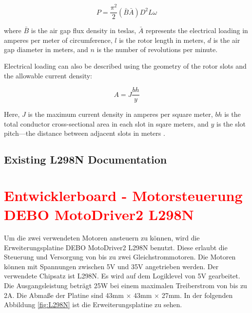 \begin{equation}
	P = \frac{\pi^2}{2}(\bar{B}\bar{A})D^2L\omega
	\label{eq:velTorqRelation}
\end{equation}

where $\bar{B}$ is the air gap flux density in teslas, $\bar{A}$ represents the electrical loading in amperes per meter of circumference, $l$ is the rotor length in meters, $d$ is the air gap diameter in meters, and $n$ is the number of revolutions per minute.

Electrical loading can also be described using the geometry of the rotor slots and the allowable current density:

\begin{equation}
	A = J \frac{bh}{y}
	\label{eq:elLoading}
\end{equation}

Here, $J$ is the maximum current density in amperes per square meter, $bh$ is the total conductor cross-sectional area in each slot in sqare meters, and $y$ is the slot pitch—the distance between adjacent slots in meters \cite[see][26]{Toliyat:2004}.


\section{Existing L298N Documentation}
\chapter{\textcolor{red}{{Entwicklerboard - Motorsteuerung DEBO MotoDriver2 L298N}}}





Um die zwei verwendeten Motoren ansteuern zu können, wird die Erweiterungsplatine DEBO MotoDriver2 L298N benutzt. Diese erlaubt die Steuerung und Versorgung von bis zu zwei Gleichstrommotoren. Die Motoren können mit Spannungen zwischen 5V und 35V angetrieben werden. Der verwendete Chipsatz ist L298N. Es wird auf dem Logiklevel von 5V gearbeitet. Die Ausgangsleistung beträgt 25W bei einem maximalen Treiberstrom von bis zu 2A. Die Abmaße der Platine sind 43mm $\times$ 43mm $\times$ 27mm. In der folgenden Abbildung \ref{fig:L298N} ist die Erweiterungsplatine zu sehen.


